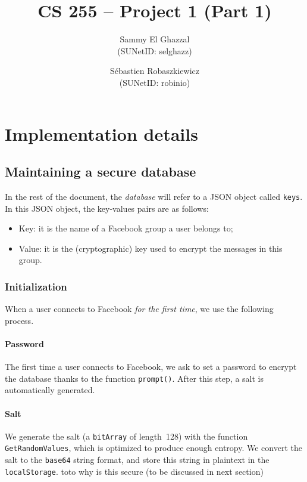 \documentclass[10pt,twocolumn]{article}
\title{
  CS 255 -- Project 1 (Part 1) }
\author{
  Sammy El Ghazzal\\
  (SUNetID: selghazz)
  \and
  S\'ebastien Robaszkiewicz\\
  (SUNetID: robinio)
}
\date{}
\begin{document}
  \maketitle




\section{Implementation details}


\subsection{Maintaining a secure database}

In the rest of the document, the \textit{database} will refer to a JSON object called \texttt{keys}. In this JSON object, the key-values pairs are as follows:
\begin{itemize}
  \item Key: it is the name of a Facebook group a user belongs to;
  \item Value: it is the (cryptographic) key used to encrypt the messages in this group.
\end{itemize}

\subsubsection{Initialization}

When a user connects to Facebook \textit{for the first time}, we use the following process.

\paragraph{Password}
The first time a user connects to Facebook, we ask to set a password to encrypt the database thanks to the function \texttt{prompt()}. After this step, a salt is automatically generated.

\paragraph{Salt}\label{salt}
We generate the salt (a \texttt{bitArray} of length~128) with the function \texttt{GetRandomValues}, which is optimized to produce enough entropy. We convert the salt to the \texttt{base64} string format, and store this string in plaintext in the \texttt{localStorage}. toto why is this secure (to be discussed in next section)
\end{document}
